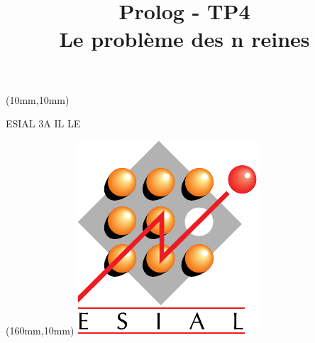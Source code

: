 \documentclass[a4paper]{article}
\title{Prolog - TP4\\Le problème des n reines}
\date{}
\begin{document}
\maketitle
\begin{textblock*}{4cm}(10mm,10mm)
\begin{Large}ESIAL 3A IL LE\end{Large}
\end{textblock*}
\begin{textblock*}{3cm}(160mm,10mm)
\includegraphics[width=\textwidth]{../../ESIAL.pdf}
\end{textblock*}
\end{document}
